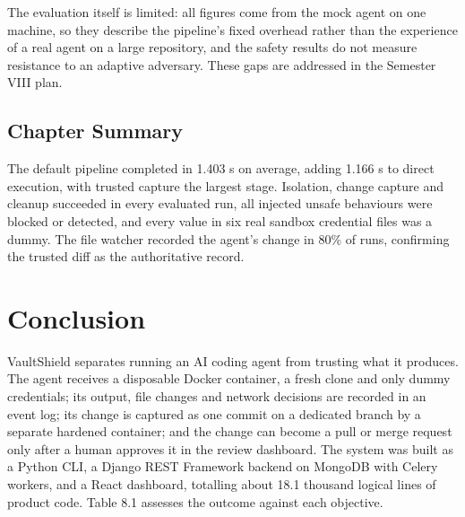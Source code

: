 \documentclass[12pt,a4paper,oneside]{report}
\begin{document}
\endgroup

The evaluation itself is limited: all figures come from the mock agent on one machine, so they describe the pipeline's fixed overhead rather than the experience of a real agent on a large repository, and the safety results do not measure resistance to an adaptive adversary. These gaps are addressed in the Semester VIII plan.

\section{Chapter Summary}\label{chapter-summary}

The default pipeline completed in 1.403 s on average, adding 1.166 s to direct execution, with trusted capture the largest stage. Isolation, change capture and cleanup succeeded in every evaluated run, all injected unsafe behaviours were blocked or detected, and every value in six real sandbox credential files was a dummy. The file watcher recorded the agent's change in 80\% of runs, confirming the trusted diff as the authoritative record.

\clearpage

\chapter{Conclusion}\label{conclusion}

VaultShield separates running an AI coding agent from trusting what it produces. The agent receives a disposable Docker container, a fresh clone and only dummy credentials; its output, file changes and network decisions are recorded in an event log; its change is captured as one commit on a dedicated branch by a separate hardened container; and the change can become a pull or merge request only after a human approves it in the review dashboard. The system was built as a Python CLI, a Django REST Framework backend on MongoDB with Celery workers, and a React dashboard, totalling about 18.1 thousand logical lines of product code. Table 8.1 assesses the outcome against each objective.
\end{document}
